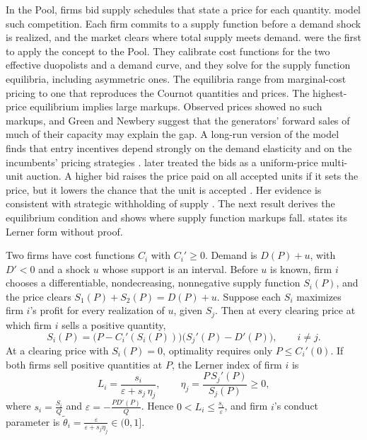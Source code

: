 In the Pool, firms bid supply schedules that state a price for each quantity. \citet{KlempererMeyer1989} model such
competition. Each firm commits to a supply function before a demand shock is realized, and the market clears where total supply meets
demand. \citet{GreenNewbery1992} were the first to apply the concept to the Pool. They calibrate cost functions for the
two effective duopolists and a demand curve, and they solve for the supply function equilibria, including asymmetric
ones. The equilibria range from marginal-cost pricing to one that reproduces the Cournot quantities and prices. The
highest-price equilibrium implies large markups. Observed prices showed no such markups, and Green and Newbery
suggest that the generators' forward sales of much of their capacity may explain the gap. A long-run version of the model finds that
entry incentives depend strongly on the demand elasticity and on the incumbents' pricing strategies
\citep[pp.~145--146]{HortacsuPerrigne2021}. \citet{Wolfram1998} later treated the bids as a uniform-price multi-unit
auction. A higher bid raises the price paid on all accepted units if it sets the price, but it lowers the chance that
the unit is accepted \citep[p.~695]{KelloggReguant2021}. Her evidence is consistent with strategic withholding of
supply \citep[p.~146]{HortacsuPerrigne2021}.
The next result derives the equilibrium condition and shows where supply function markups fall. 
states its Lerner form without proof.

\begin{proposition}\label{prop:03-sfe-markup}
Two firms have cost functions $C_i$ with $C_i' \ge 0$. Demand is $D(P) + u$, with $D' < 0$ and a shock $u$ whose support
is an interval. Before $u$ is known, firm $i$ chooses a differentiable, nondecreasing, nonnegative supply function
$S_i(P)$, and the price clears $S_1(P) + S_2(P) = D(P) + u$. Suppose each $S_i$ maximizes firm $i$'s profit for every
realization of $u$, given $S_j$. Then at every clearing price at which firm $i$ sells a positive quantity,
\begin{equation}\label{eq:03-sfe-ode}
S_i(P) = \bigl(P - C_i'(S_i(P))\bigr)\bigl(S_j'(P) - D'(P)\bigr), \qquad i \ne j.
\end{equation}
At a clearing price with $S_i(P) = 0$, optimality requires only $P \le C_i'(0)$. If both firms sell positive
quantities at $P$, the Lerner index of firm $i$ is
\begin{equation}\label{eq:03-sfe-lerner}
L_i = \frac{s_i}{\varepsilon + s_j\,\eta_j}, \qquad \eta_j = \frac{P\,S_j'(P)}{S_j(P)} \ge 0,
\end{equation}
where $s_i = \frac{S_i}{Q}$ and $\varepsilon = -\frac{P D'(P)}{Q}$. Hence $0 < L_i \le \frac{s_i}{\varepsilon}$, and
firm $i$'s conduct parameter is $\tilde\theta_i = \frac{\varepsilon}{\varepsilon + s_j\eta_j} \in (0, 1]$.
\end{proposition}

